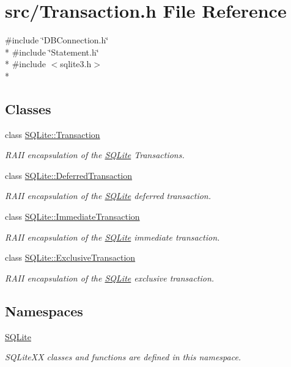 \hypertarget{a00034}{\section{src/\-Transaction.h File Reference}
\label{a00034}
}
{\ttfamily \#include \char`\"{}D\-B\-Connection.\-h\char`\"{}}\\*
{\ttfamily \#include \char`\"{}Statement.\-h\char`\"{}}\\*
{\ttfamily \#include $<$sqlite3.\-h$>$}\\*
\subsection*{Classes}
\begin{DoxyCompactItemize}
\item 
class \hyperlink{a00014}{S\-Q\-Lite\-::\-Transaction}
\begin{DoxyCompactList}\small\item\em R\-A\-I\-I encapsulation of the \hyperlink{a00038}{S\-Q\-Lite} Transactions. \end{DoxyCompactList}\item 
class \hyperlink{a00005}{S\-Q\-Lite\-::\-Deferred\-Transaction}
\begin{DoxyCompactList}\small\item\em R\-A\-I\-I encapsulation of the \hyperlink{a00038}{S\-Q\-Lite} deferred transaction. \end{DoxyCompactList}\item 
class \hyperlink{a00008}{S\-Q\-Lite\-::\-Immediate\-Transaction}
\begin{DoxyCompactList}\small\item\em R\-A\-I\-I encapsulation of the \hyperlink{a00038}{S\-Q\-Lite} immediate transaction. \end{DoxyCompactList}\item 
class \hyperlink{a00007}{S\-Q\-Lite\-::\-Exclusive\-Transaction}
\begin{DoxyCompactList}\small\item\em R\-A\-I\-I encapsulation of the \hyperlink{a00038}{S\-Q\-Lite} exclusive transaction. \end{DoxyCompactList}\end{DoxyCompactItemize}
\subsection*{Namespaces}
\begin{DoxyCompactItemize}
\item 
\hyperlink{a00038}{S\-Q\-Lite}
\begin{DoxyCompactList}\small\item\em S\-Q\-Lite\-X\-X classes and functions are defined in this namespace. \end{DoxyCompactList}\end{DoxyCompactItemize}
